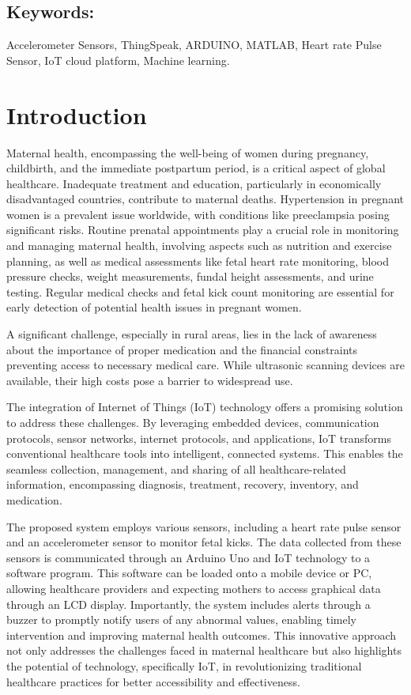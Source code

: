 \documentclass[12pt,a4paper,oneside]{report}
\begin{document}
		\subsection*{Keywords:}Accelerometer Sensors, ThingSpeak, ARDUINO, MATLAB, Heart rate Pulse Sensor, IoT cloud platform, Machine learning.
		
	
	
	
	\newpage
	\section{Introduction}
	Maternal health, encompassing the well-being of women during pregnancy, childbirth, and the immediate postpartum period, is a critical aspect of global healthcare. Inadequate treatment and education, particularly in economically disadvantaged countries, contribute to maternal deaths. Hypertension in pregnant women is a prevalent issue worldwide, with conditions like preeclampsia posing significant risks. Routine prenatal appointments play a crucial role in monitoring and managing maternal health, involving aspects such as nutrition and exercise planning, as well as medical assessments like fetal heart rate monitoring, blood pressure checks, weight measurements, fundal height assessments, and urine testing. Regular medical checks and fetal kick count monitoring are essential for early detection of potential health issues in pregnant women.
	
	A significant challenge, especially in rural areas, lies in the lack of awareness about the importance of proper medication and the financial constraints preventing access to necessary medical care. While ultrasonic scanning devices are available, their high costs pose a barrier to widespread use.
	
	The integration of Internet of Things (IoT) technology offers a promising solution to address these challenges. By leveraging embedded devices, communication protocols, sensor networks, internet protocols, and applications, IoT transforms conventional healthcare tools into intelligent, connected systems. This enables the seamless collection, management, and sharing of all healthcare-related information, encompassing diagnosis, treatment, recovery, inventory, and medication.
	
	The proposed system employs various sensors, including a heart rate pulse sensor and an accelerometer sensor to monitor fetal kicks. The data collected from these sensors is communicated through an Arduino Uno and IoT technology to a software program. This software can be loaded onto a mobile device or PC, allowing healthcare providers and expecting mothers to access graphical data through an LCD display. Importantly, the system includes alerts through a buzzer to promptly notify users of any abnormal values, enabling timely intervention and improving maternal health outcomes. This innovative approach not only addresses the challenges faced in maternal healthcare but also highlights the potential of technology, specifically IoT, in revolutionizing traditional healthcare practices for better accessibility and effectiveness.\cite{b1}
	
\end{document}
